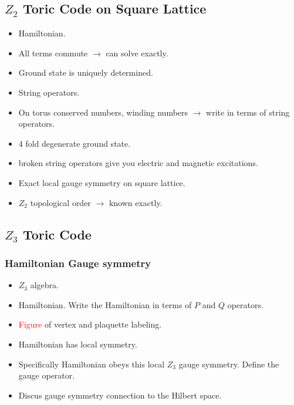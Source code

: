 \documentclass[aps,floatfix,11pt]{revtex4-1}
\begin{document}
    \subsection{$Z_2$ Toric Code on Square Lattice}
        \begin{itemize}
        \item Hamiltonian.
        \item All terms commute $\rightarrow$ can solve exactly.
        \item Ground state is uniquely determined. 
        \item String operators.
        \item On torus conserved numbers, winding numbers $\rightarrow$ write in terms of string
            operators.
        \item 4 fold degenerate ground state.
        \item broken string operators give you electric and magnetic excitations.
        \item Exact local gauge symmetry on square lattice.
        \item $Z_2$ topological order $\rightarrow$ known exactly. 
        \end{itemize}

    \subsection{$Z_3$ Toric Code}
        \subsubsection{Hamiltonian Gauge symmetry }
            \begin{itemize}
                \item $Z_3$ algebra.
                \item Hamiltonian. Write the Hamiltonian in terms of $P$ and $Q$ operators. 
                \item \textcolor{red}{Figure} of vertex and plaquette labeling.
                \item Hamiltonian has local symmetry. 
                \item Specifically Hamiltonian obeys this local $Z_3$ gauge symmetry. Define the gauge operator. 
                \item Discus gauge symmetry connection to the Hilbert space.
            \end{itemize}
\end{document}
